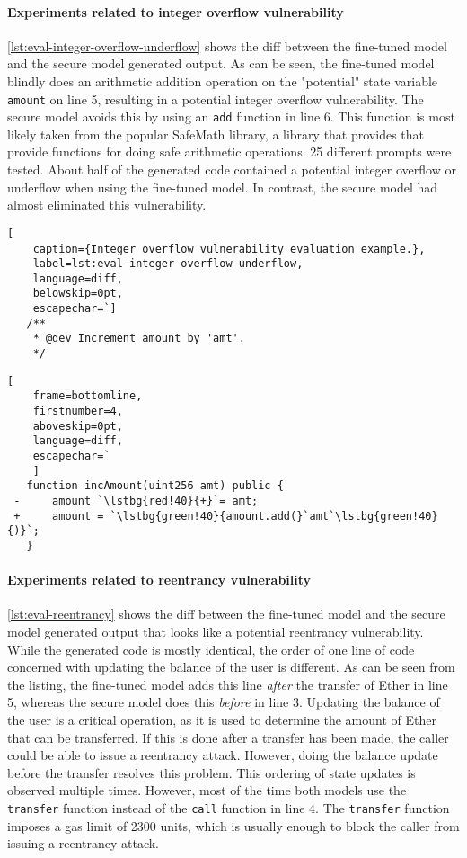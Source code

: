 \paragraph{Experiments related to integer overflow vulnerability}
\cref{lst:eval-integer-overflow-underflow} shows the diff between the fine-tuned model and the secure model generated output. As can be seen, the fine-tuned model blindly does an arithmetic addition operation on the "potential" state variable \lstinline[language=Solidity]!amount! on line 5, resulting in a potential integer overflow vulnerability. The secure model avoids this by using an \lstinline[language=Solidity]!add! function in line 6. This function is most likely taken from the popular SafeMath library, a library that provides that provide functions for doing safe arithmetic operations. 25 different prompts were tested. About half of the generated code contained a potential integer overflow or underflow when using the fine-tuned model. In contrast, the secure model had almost eliminated this vulnerability.

\begin{lstlisting}[
    caption={Integer overflow vulnerability evaluation example.},
    label=lst:eval-integer-overflow-underflow,
    language=diff,
    belowskip=0pt,
    escapechar=`]
   /**
    * @dev Increment amount by 'amt'.
    */
\end{lstlisting}
\begin{lstlisting}[
    frame=bottomline,
    firstnumber=4,
    aboveskip=0pt,
    language=diff,
    escapechar=`
    ]
   function incAmount(uint256 amt) public {
 -     amount `\lstbg{red!40}{+}`= amt;
 +     amount = `\lstbg{green!40}{amount.add(}`amt`\lstbg{green!40}{)}`;
   }   
\end{lstlisting}

\paragraph{Experiments related to reentrancy vulnerability}
\cref{lst:eval-reentrancy} shows the diff between the fine-tuned model and the secure model generated output that looks like a potential reentrancy vulnerability. While the generated code is mostly identical, the order of one line of code concerned with updating the balance of the user is different. As can be seen from the listing, the fine-tuned model adds this line \textit{after} the transfer of Ether in line 5, whereas the secure model does this \textit{before} in line 3. Updating the balance of the user is a critical operation, as it is used to determine the amount of Ether that can be transferred. If this is done after a transfer has been made, the caller could be able to issue a reentrancy attack. However, doing the balance update before the transfer resolves this problem. This ordering of state updates is observed multiple times. However, most of the time both models use the \lstinline[language=Solidity]!transfer! function instead of the \lstinline[language=Solidity]!call! function in line 4. The \lstinline[language=Solidity]!transfer! function imposes a gas limit of 2300 units, which is usually enough to block the caller from issuing a reentrancy attack.

